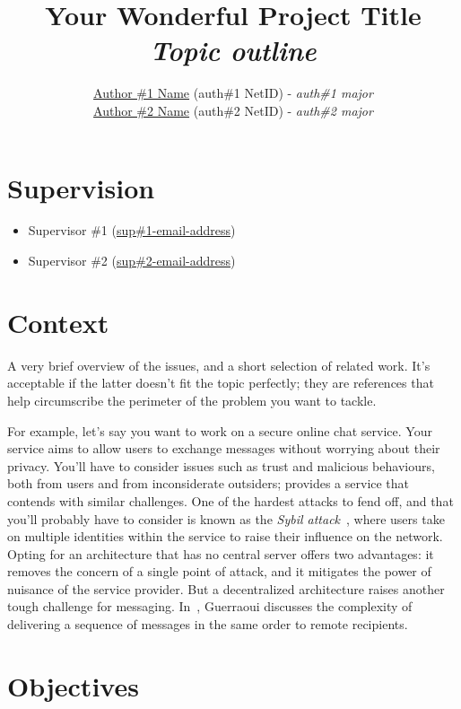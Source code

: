 \documentclass{article}
\title{Your Wonderful Project Title\\
        \Large \emph{Topic outline}}
\author{\href{mailto:author1@nyu.edu}{Author \#1 Name} (auth\#1 NetID) - \emph{auth\#1 major}\\ \href{mailto:author2@nyu.edu}{Author \#2 Name} (auth\#2 NetID) - \emph{auth\#2 major}}
\date{\vspace{-5ex}} %
\begin{document}
\maketitle
\thispagestyle{firstpage}

\section*{Supervision}

\begin{itemize}
\renewcommand\labelitemi{--}
    \item Supervisor \#1 (\href{mailto:supervisor1@nyu.edu}{sup\#1-email-address})
    \item Supervisor \#2 (\href{mailto:supervisor2@nyu.edu}{sup\#2-email-address})
\end{itemize}


\section*{Context}

A very brief overview of the issues, and a short selection of related work. It's acceptable if the latter doesn't fit the topic perfectly; they are references that help circumscribe the perimeter of the problem you want to tackle. 

For example, let's say you want to work on a secure online chat service. Your service aims to allow users to exchange messages without worrying about their privacy. 
You'll have to consider issues such as trust and malicious behaviours, both from users and from inconsiderate outsiders; \cite{byzantine-pki} provides a service that contends with similar challenges. One of the hardest attacks to fend off, and that you'll probably have to consider is known as the \textit{Sybil attack}~\cite{sybilattack}, where users take on multiple identities within the service to raise their influence on the network. Opting for an architecture that has no central server offers two advantages: it removes the concern of a single point of attack, and it mitigates the power of nuisance of the service provider. But a decentralized architecture raises another tough challenge for messaging. In~\cite{atomic-mcast-tcs01}, Guerraoui discusses the complexity of delivering a sequence of messages in the same order to remote recipients.


\section*{Objectives}
\end{document}
